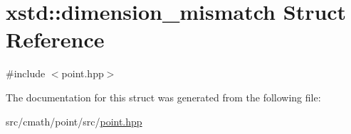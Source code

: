 \hypertarget{structxstd_1_1dimension__mismatch}{\section{xstd\-:\-:dimension\-\_\-mismatch Struct Reference}
\label{structxstd_1_1dimension__mismatch}
}


{\ttfamily \#include $<$point.\-hpp$>$}



The documentation for this struct was generated from the following file\-:\begin{DoxyCompactItemize}
\item 
src/cmath/point/src/\hyperlink{point_8hpp}{point.\-hpp}\end{DoxyCompactItemize}
